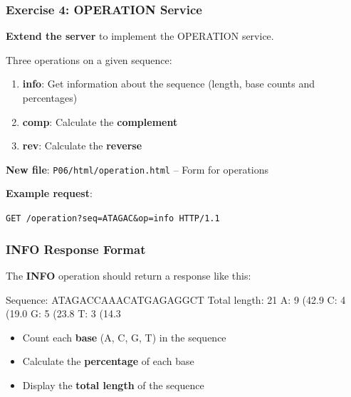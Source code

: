 \documentclass[xcolor=table]{beamer}
\begin{document}
\begin{frame}
\frametitle{Exercise 4: OPERATION Service}

\textbf{Extend the server} to implement the OPERATION service.

\vspace{0.2cm}

Three operations on a given sequence:
\begin{enumerate}
\item \textbf{info}: Get information about the sequence (length, base counts and percentages)
\item \textbf{comp}: Calculate the \textbf{complement}
\item \textbf{rev}: Calculate the \textbf{reverse}
\end{enumerate}

\vspace{0.2cm}

\textbf{New file}: \texttt{P06/html/operation.html} -- Form for operations

\vspace{0.2cm}

\textbf{Example request}:

\vspace{0.1cm}

\begin{center}
\texttt{GET /operation?seq=ATAGAC\&op=info HTTP/1.1}
\end{center}

\end{frame}

\begin{frame}[fragile]
\frametitle{INFO Response Format}

The \textbf{INFO} operation should return a response like this:

\vspace{0.2cm}

\begin{python}[language={}]
Sequence: ATAGACCAAACATGAGAGGCT
Total length: 21
A: 9 (42.9%
C: 4 (19.0%
G: 5 (23.8%
T: 3 (14.3%
\end{python}

\vspace{0.2cm}

\begin{itemize}
\item Count each \textbf{base} (A, C, G, T) in the sequence
\item Calculate the \textbf{percentage} of each base
\item Display the \textbf{total length} of the sequence
\end{itemize}

\end{frame}
\end{document}
